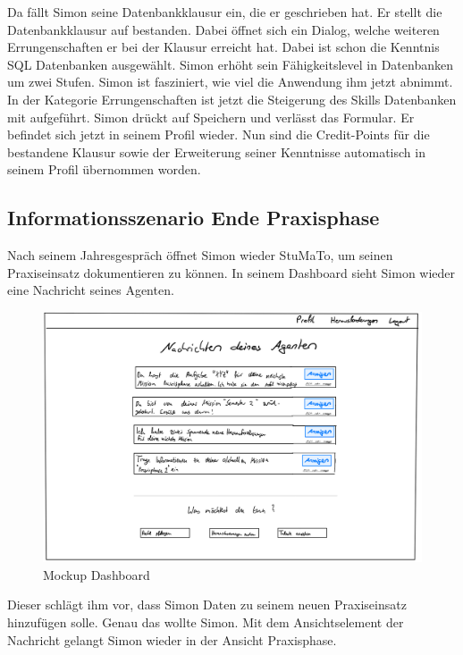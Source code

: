 \documentclass[
  12pt,
  ngerman,
  a4paper,
]{article}
\begin{document}
Da fällt Simon seine Datenbankklausur ein, die er geschrieben hat. Er
stellt die Datenbankklausur auf bestanden. Dabei öffnet sich ein Dialog,
welche weiteren Errungenschaften er bei der Klausur erreicht hat. Dabei
ist schon die Kenntnis SQL Datenbanken ausgewählt. Simon erhöht sein
Fähigkeitslevel in Datenbanken um zwei Stufen. Simon ist fasziniert, wie
viel die Anwendung ihm jetzt abnimmt. In der Kategorie Errungenschaften
ist jetzt die Steigerung des Skills Datenbanken mit aufgeführt. Simon
drückt auf Speichern und verlässt das Formular. Er befindet sich jetzt
in seinem Profil wieder. Nun sind die Credit-Points für die bestandene
Klausur sowie der Erweiterung seiner Kenntnisse automatisch in seinem
Profil übernommen worden.

\hypertarget{informationsszenario-ende-praxisphase}{%
\subsection{Informationsszenario Ende
Praxisphase}\label{informationsszenario-ende-praxisphase}}

Nach seinem Jahresgespräch öffnet Simon wieder StuMaTo, um seinen
Praxiseinsatz dokumentieren zu können. In seinem Dashboard sieht Simon
wieder eine Nachricht seines Agenten.

\begin{figure}
\centering
\includegraphics{./tex2pdf.-930e6666e1221838/3da0b6a22e1420a1cf0259b225757671a18ac72e.jpg}
\caption{Mockup Dashboard}
\end{figure}

Dieser schlägt ihm vor, dass Simon Daten zu seinem neuen Praxiseinsatz
hinzufügen solle. Genau das wollte Simon. Mit dem Ansichtselement der
Nachricht gelangt Simon wieder in der Ansicht Praxisphase.
\end{document}
